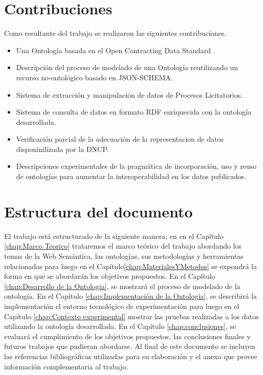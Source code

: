 \section{Contribuciones}
\label{Contribuciones}
Como resultante del trabajo se realizaron las siguientes contribuciones.
\begin{itemize}
\item \label{contrib:3}Una Ontología basada en el Open Contracting Data Standard \cite{OCDSReleaseSchema:online}.
\item \label{contrib:2}Descripción del proceso de modelado de una Ontología reutilizando un recurso no-ontológico basado en JSON-SCHEMA\cite {JSONSche10:online}.
\item \label{contrib:1}Sistema de extracción y manipulación de datos de Procesos Licitatorios.
\item \label{contrib:4}Sistema de consulta de datos en formato RDF enriquecida con la ontología desarrollada.
\item \label{contrib:6}Verificación parcial de la adecuación de la representacion de datos disponinilizada por la DNCP.
\item \label{contrib:5}Descripciones experimentales de la pragmática de incorporación, uso y reuso de ontologías para aumentar la interoperabilidad en los datos publicados.

\end{itemize}
 

\section{Estructura del documento}
El trabajo está estructurado de la siguiente manera; en  en el  Capítulo \ref{chap:Marco Teorico}  trataremos el marco teórico del trabajo abordando los temas de la Web Semántica, las ontologías, sus metodologías y herramientas relacionadas para luego en el Capítulo\ref{chap:MaterialesYMetodos} se expondrá la forma en que se abordarán los objetivos propuestos. En el Capítulo \ref{chap:Desarrollo de la Ontologia}, se mostrará el proceso de modelado de la ontología. En el Capítulo \ref{chap:Implementación de la Ontologia}, se describirá la implementación el entorno tecnológico de experimentación para luego en el Capítulo  \ref{chap:Contexto experimental} mostrar las pruebas realizadas a los datos utilizando la ontología desarrollada. En el Capítulo \ref{chap:conclusiones}, se evaluará el cumplimiento de los objetivos propuestos, las conclusiones finales y futuros trabajos que pudieran abordarse. Al final de este documento  se  incluyen las referencias bibliográficas utilizadas para su elaboración y el anexo que provee información complementaria al trabajo.


